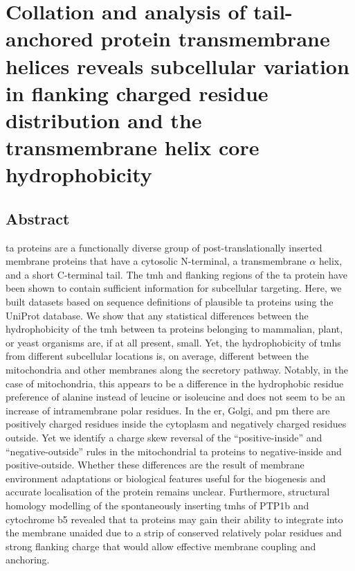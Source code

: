 \chapter{Collation and analysis of tail-anchored protein transmembrane helices reveals subcellular variation in flanking charged residue distribution and the transmembrane helix core hydrophobicity}

\sloppy

\section{Abstract}

\gls{ta} proteins are a functionally diverse group of post\--translationally inserted membrane proteins that have a cytosolic N-terminal, a transmembrane $\alpha$ helix, and a short C\--terminal tail.
The \gls{tmh} and flanking regions of the \gls{ta} protein have been shown to contain sufficient information for subcellular targeting.
Here, we built datasets based on sequence definitions of plausible \gls{ta} proteins using the  UniProt database.
We show that any statistical differences between the hydrophobicity of the \gls{tmh} between \gls{ta} proteins belonging to mammalian, plant, or yeast organisms are, if at all present, small.
Yet, the hydrophobicity of \gls{tmh}s from different subcellular locations is, on average, different between the mitochondria and other membranes along the secretory pathway.
Notably, in the case of mitochondria, this appears to be a difference in the hydrophobic residue preference of alanine instead of leucine or isoleucine and does not seem to be an increase of intramembrane polar residues.
In the \gls{er}, Golgi, and \gls{pm} there are positively charged residues inside the cytoplasm and negatively charged residues outside.
Yet we identify a charge skew reversal of the ``positive\--inside'' and ``negative\--outside'' rules in the mitochondrial \gls{ta} proteins to negative\--inside and positive\--outside.
Whether these differences are the result of membrane environment adaptations or biological features useful for the biogenesis and accurate localisation of the protein remains unclear.
Furthermore, structural homology modelling of the spontaneously inserting \gls{tmh}s of PTP1b and cytochrome b5 revealed that \gls{ta} proteins may gain their ability to integrate into the membrane unaided due to a strip of conserved relatively polar residues and strong flanking charge that would allow effective membrane coupling and anchoring.

